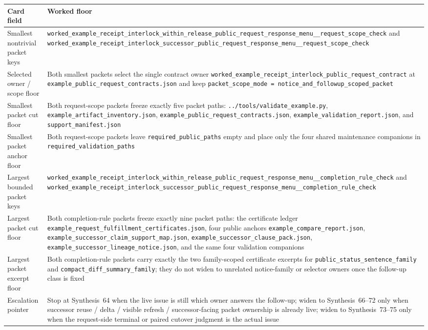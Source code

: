 \documentclass[11pt]{article}
\begin{document}
\begin{table}[t]
\centering
\footnotesize
\begin{tabularx}{\linewidth}{@{}l X@{}}
\toprule
Card field & Worked floor \\
\midrule
Smallest nontrivial packet keys & \nolinkurl{worked_example_receipt_interlock_within_release_public_request_response_menu__request_scope_check} and \nolinkurl{worked_example_receipt_interlock_successor_public_request_response_menu__request_scope_check} \\
Selected owner / scope floor & Both smallest packets select the single contract owner \nolinkurl{worked_example_receipt_interlock_public_request_contract} at \nolinkurl{example_public_request_contracts.json} and keep \nolinkurl{packet_scope_mode = notice_and_followup_scoped_packet} \\
Smallest packet cut floor & Both request-scope packets freeze exactly five packet paths: \nolinkurl{../tools/validate_example.py}, \nolinkurl{example_artifact_inventory.json}, \nolinkurl{example_public_request_contracts.json}, \nolinkurl{example_validation_report.json}, and \nolinkurl{support_manifest.json} \\
Smallest packet anchor floor & Both request-scope packets leave \nolinkurl{required_public_paths} empty and place only the four shared maintenance companions in \nolinkurl{required_validation_paths} \\
Largest bounded packet keys & \nolinkurl{worked_example_receipt_interlock_within_release_public_request_response_menu__completion_rule_check} and \nolinkurl{worked_example_receipt_interlock_successor_public_request_response_menu__completion_rule_check} \\
Largest packet cut floor & Both completion-rule packets freeze exactly nine packet paths: the certificate ledger \nolinkurl{example_request_fulfillment_certificates.json}, four public anchors \nolinkurl{example_compare_report.json}, \nolinkurl{example_successor_claim_support_map.json}, \nolinkurl{example_successor_clause_pack.json}, \nolinkurl{example_successor_lineage_notice.json}, and the same four validation companions \\
Largest packet excerpt floor & Both completion-rule packets carry exactly the two family-scoped certificate excerpts for \nolinkurl{public_status_sentence_family} and \nolinkurl{compact_diff_summary_family}; they do not widen to unrelated notice-family or selector owners once the follow-up class is fixed \\
Escalation pointer & Stop at Synthesis~64 when the live issue is still which owner answers the follow-up; widen to Synthesis~66--72 only when successor reuse / delta / visible refresh / successor-facing packet ownership is already live; widen to Synthesis~73--75 only when the request-side terminal or paired cutover judgment is the actual issue \\

\end{tabularx}
\end{table}
\end{document}
